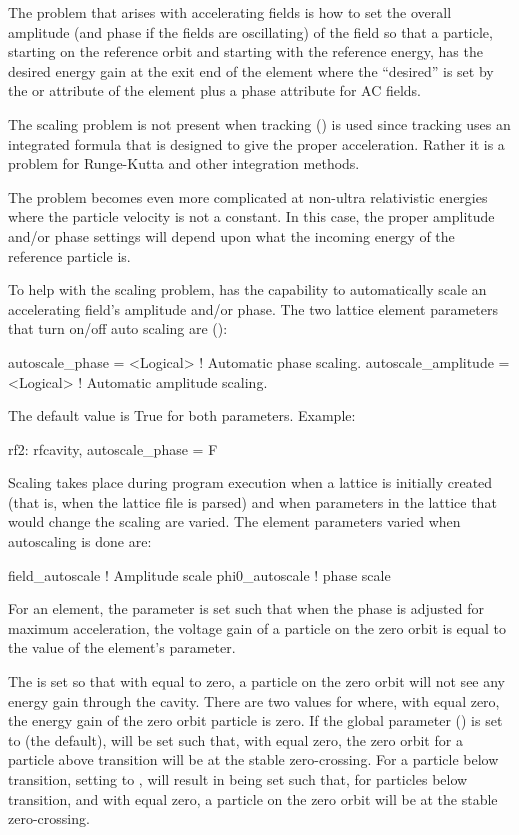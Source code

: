 The problem that arises with accelerating fields is how to set the overall amplitude (and phase if
the fields are oscillating) of the field so that a particle, starting on the reference orbit and
starting with the reference energy, has the desired energy gain at the exit end of the element where
the ``desired'' is set by the  or  attribute of the element plus a
 phase attribute for AC fields.

The scaling problem is not present when  tracking () is used since
 tracking uses an integrated formula that is designed to give the proper
acceleration. Rather it is a problem for Runge-Kutta and other integration methods.

The problem becomes even more complicated at non-ultra relativistic energies where the particle
velocity is not a constant. In this case, the proper amplitude and/or phase settings will depend
upon what the incoming energy of the reference particle is.

To help with the scaling problem, \bmad has the capability to automatically scale an accelerating
field's amplitude and/or phase. The two lattice element parameters that turn on/off auto scaling are
():
\begin{example}
  autoscale_phase      = <Logical>  ! Automatic phase scaling.
  autoscale_amplitude  = <Logical>  ! Automatic amplitude scaling.
\end{example}
The default value is True for both parameters. Example:
\begin{example}
  rf2: rfcavity, autoscale_phase = F
\end{example}

Scaling takes place during program execution when a lattice is initially created (that is,
when the lattice file is parsed) and when parameters in the lattice that would change the
scaling are varied.  The element parameters varied when autoscaling is done are:
\begin{example}
  field_autoscale       ! Amplitude scale
  phi0_autoscale        ! phase scale
\end{example}
For an  element, the  parameter is set such that when the phase is
adjusted for maximum acceleration, the voltage gain of a particle on the zero orbit is equal to the
value of the element's  parameter. 

The  is set so that with  equal to zero, a particle on the zero orbit
will not see any energy gain through the cavity. There are two values for  where,
with  equal zero, the energy gain of the zero orbit particle is zero. If the 
global parameter  () is set to  (the
default),  will be set such that, with  equal zero, the zero orbit for a
particle above transition will be at the stable zero-crossing. For a particle below transition,
setting  to , will result in  being
set such that, for particles below transition, and with  equal zero, a particle on the zero
orbit will be at the stable zero-crossing.

